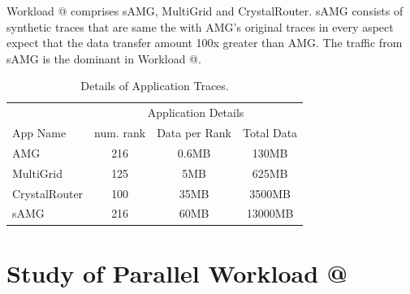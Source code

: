 \documentclass[conference,compsoc]{IEEEtran}
\makeatletter
\newcommand{\Rmnum}[1]{\expandafter\@slowromancap\romannumeral #1@}
\makeatother
\begin{document}
Workload \Rmnum{2} comprises sAMG, MultiGrid and CrystalRouter. sAMG consists of synthetic traces that are same the with AMG's original traces in every aspect expect that the data transfer amount 100x greater than AMG. The traffic from sAMG is the dominant in Workload \Rmnum{2}.


\begin{table}[ht]
\begin{center}
\caption{Details of Application Traces.} 
\label{tab:apps-detail}
\begin{tabular}{l c c c }
\toprule %
\toprule
&\multicolumn{3}{c}{Application Details} \\ %
\cmidrule(l){2-4}
App Name & num. rank & Data per Rank & Total Data\\ %
\midrule %
AMG  &    216 &   0.6MB   &     130MB\\ %
\midrule
MultiGrid  &    125 &   5MB   &     625MB\\ 
\midrule
CrystalRouter  &   100  &  35MB    &     3500MB\\ 
\midrule
sAMG  &    216 &   60MB   &     13000MB\\ %
\midrule %
\bottomrule %
\end{tabular}
\end{center}
\end{table}


\section{Study of Parallel Workload \Rmnum{1 }}
\label{sec:workload-1}

\end{document}
